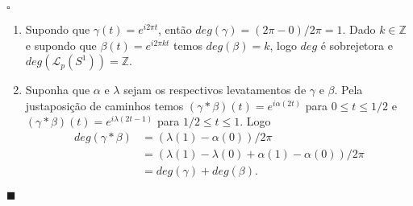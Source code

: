 \documentclass[12pt]{book}
\newenvironment{prova}[1]{$\square$ #1}{\hfill$\blacksquare$}
\newcommand{\caminhos}{\mathcal{L}}
\newcommand{\caminhospontobasegeral}[2]{\caminhos_{#1}(#2)}
\newcommand{\circulo}{S^{1}}
\newcommand{\inteiros}{\mathbb{Z}}
\begin{document}
	\begin{prova}
		\begin{enumerate}
			\item Supondo que $\gamma(t) = e^{i2\pi t}$, então $deg(\gamma) = (2\pi -0)/2\pi =1$. Dado $k \in \inteiros$ e supondo que $\beta(t) = e^{i2\pi kt}$ temos $deg(\beta) = k$, logo $deg$ é sobrejetora e $deg(\caminhospontobasegeral{p}{\circulo}) = \inteiros$.
			
			\item Suponha que $\alpha$ e $\lambda$ sejam os respectivos levatamentos de $\gamma$ e $\beta$. Pela justaposição de caminhos temos $(\gamma*\beta)(t) = e^{i\alpha(2t)}$ para $0\leq t\leq 1/2$ e  $(\gamma*\beta)(t) = e^{i\lambda(2t - 1)}$ para $1/2\leq t\leq 1$. Logo 
			$$
			\begin{aligned}
			deg(\gamma*\beta) &= (\lambda(1)- \alpha(0))/2\pi 
			\\
			&= (\lambda(1) -\lambda(0)+ \alpha(1)- \alpha(0))/2\pi
			\\
			&= deg(\gamma)+deg(\beta).
			\end{aligned}
			$$  
						

\end{enumerate}
\end{prova}
\end{document}
